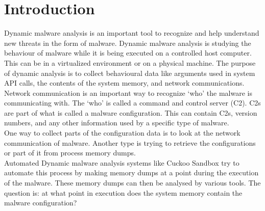 \documentclass[conference]{IEEEtran}
\begin{document}





%
\IEEEpeerreviewmaketitle



\section{Introduction}
Dynamic malware analysis is an important tool to recognize and help understand new threats in the form of malware. 
Dynamic malware analysis is studying the behaviour of malware while it is being executed on a controlled host computer. This can be in a virtualized environment or on a physical machine. The purpose of dynamic analysis is to collect behavioural data like arguments used in system API calls, the contents of the system memory, and network communications. Network communication is an important way to recognize ‘who’ the malware is communicating with. The ‘who’ is called a command and control server (\Gls{C2}). C2s are part of what is called a malware configuration. This can contain C2s, version numbers, and any other information used by a specific type of malware.\\

One way to collect parts of the \Gls{configuration data} is to look at the network communication of malware. Another type is trying to retrieve the configurations or part of it from process memory dumps.\\

Automated Dynamic malware analysis systems like Cuckoo Sandbox try to automate this process by making memory dumps at a point during the execution of the malware. These memory dumps can then be analysed by various tools. The question is: at what point in execution does the system memory contain the malware configuration?\\
\end{document}

